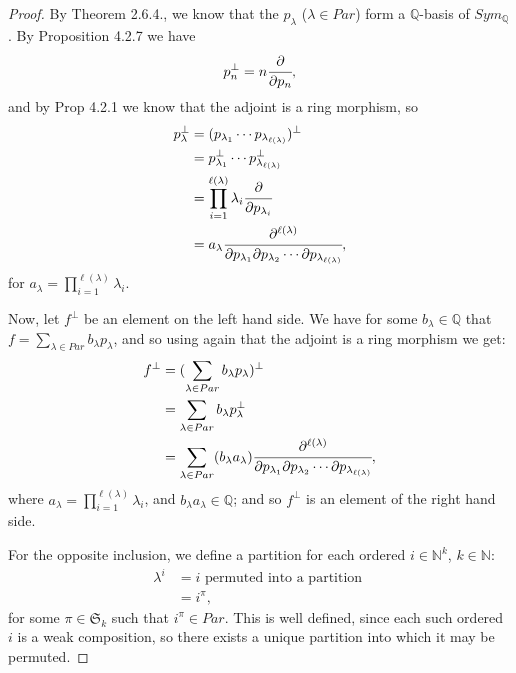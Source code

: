\documentclass[8pt]{extarticle}
\newcommand{\N}{\mathbb{N}}
\newcommand{\Q}{\mathbb{Q}}
\newcommand{\<}{\langle}
\renewcommand{\>}{\rangle}
\theoremstyle{definition}
\begin{document}
\begin{proof}
  By Theorem 2.6.4., we know that the $p_\lambda$ ($\lambda \in Par$) form a $\Q$-basis of $Sym_\Q$. By Proposition 4.2.7 we have
  \begin{align*}
    p_n^{\perp} = n \cfrac{\partial}{\partial p_n},
  \end{align*}
  and by Prop 4.2.1 we know that the adjoint is a ring morphism, so
  \begin{align*}
    p_{\lambda}^{\perp} &=
    (p_{\lambda_1} \cdots p_{\lambda_{\ell(\lambda)}})^{\perp} \\
    &= p_{\lambda_1}^{\perp} \cdots p_{\lambda_{\ell(\lambda)}}^{\perp} \\
    &= \prod_{i=1}^{\ell(\lambda)} \lambda_i \cfrac{\partial}{\partial p_{\lambda_i}} \\
    &= a_{\lambda} \cfrac{\partial^{\ell(\lambda)}}{\partial p_{\lambda_1}\partial p_{\lambda_2} \cdots \partial p_{\lambda_{\ell(\lambda)}}},
  \end{align*}
  for $a_{\lambda} = \prod\limits_{i=1}^{\ell(\lambda)} \lambda_i$.

  Now, let $f^{\perp}$ be an element on the left hand side. We have for some $b_\lambda \in \Q$ that $f = \sum\limits_{\lambda \in Par} b_{\lambda} p_{\lambda}$, and so using again that the adjoint is a ring morphism we get:
  \begin{align*}
    f^{\perp}
    &=
    (\sum\limits_{\lambda \in Par} b_{\lambda} p_{\lambda})^{\perp}
    \\
    &=
    \sum\limits_{\lambda \in Par} b_{\lambda} p_{\lambda}^{\perp}    \\
    &=
    \sum\limits_{\lambda \in Par} (b_{\lambda} a_{\lambda}) \cfrac{\partial^{\ell(\lambda)}}{\partial p_{\lambda_1}\partial p_{\lambda_2} \cdots \partial p_{\lambda_{\ell(\lambda)}}}, 
  \end{align*}
  where $a_{\lambda} = \prod\limits_{i=1}^{\ell(\lambda)} \lambda_i$, and $b_{\lambda} a_{\lambda} \in \Q$; and so $f^{\perp}$ is an element of the right hand side.

  For the opposite inclusion, we define a partition for each ordered $i \in \N^k$, $k \in \N$:
  \begin{align*}
    \lambda^i
    &= i \text{ permuted into a partition } \\
    &= i^{\pi},
  \end{align*}
  for some $\pi \in \mathfrak{S}_k$ such that $i^{\pi} \in Par$. This is well defined, since each such ordered $i$ is a weak composition, so there exists a unique partition into which it may be permuted.


\end{proof}
\end{document}
